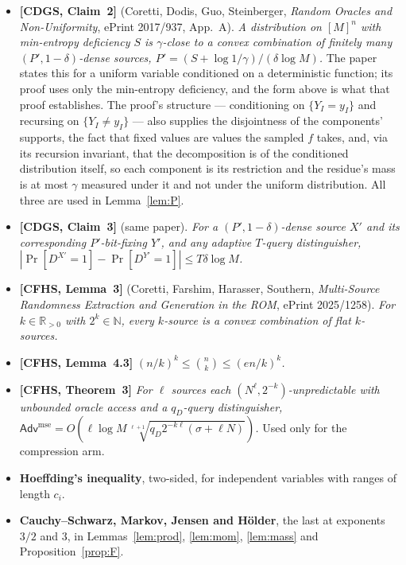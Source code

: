 \documentclass{aicr-solution}
\newcommand{\Adv}{\mathsf{Adv}}
\newcommand{\Prob}[1]{\Pr\!\left[#1\right]}
\begin{document}
\begin{itemize}
\item \textbf{[CDGS, Claim~2]} (Coretti, Dodis, Guo, Steinberger, \emph{Random
  Oracles and Non-Uniformity}, ePrint 2017/937, App.~A). \emph{A distribution on
  $[M]^{n}$ with min-entropy deficiency $S$ is $\gamma$-close to a convex
  combination of finitely many $(P',1-\delta)$-dense sources,
  $P'=(S+\log1/\gamma)/(\delta\log M)$.} The paper states this for a uniform
  variable conditioned on a deterministic function; its proof uses only the
  min-entropy deficiency, and the form above is what that proof establishes. The
  proof's structure --- conditioning on $\{Y_I=y_I\}$ and recursing on
  $\{Y_I\ne y_I\}$ --- also supplies the disjointness of the components'
  supports, the fact that fixed values are values the sampled $f$ takes, and,
  via its recursion invariant, that the decomposition is of the conditioned
  distribution itself, so each component is its restriction and the residue's
  mass is at most $\gamma$ measured under it and not under the uniform
  distribution. All three are used in Lemma~\ref{lem:P}.
\item \textbf{[CDGS, Claim~3]} (same paper). \emph{For a $(P',1-\delta)$-dense
  source $X'$ and its corresponding $P'$-bit-fixing $Y'$, and any adaptive
  $T$-query distinguisher, $|\Prob{D^{X'}=1}-\Prob{D^{Y'}=1}|\le T\delta\log M$.}
\item \textbf{[CFHS, Lemma~3]} (Coretti, Farshim, Harasser, Southern,
  \emph{Multi-Source Randomness Extraction and Generation in the ROM}, ePrint
  2025/1258). \emph{For $k\in\mathbb R_{>0}$ with $2^{k}\in\mathbb N$, every
  $k$-source is a convex combination of flat $k$-sources.}
\item \textbf{[CFHS, Lemma~4.3]} \emph{$(n/k)^{k}\le\binom nk\le(en/k)^{k}$.}
\item \textbf{[CFHS, Theorem~3]} \emph{For $\ell$ sources each
  $(N^{\ell},2^{-k})$-unpredictable with unbounded oracle access and a
  $q_D$-query distinguisher,
  $\Adv^{\mathrm{mse}}=O(\ell\log M\sqrt[\ell+1]{q_D2^{-k\ell}(\sigma+\ell N)})$.}
  Used only for the compression arm.
\item \textbf{Hoeffding's inequality}, two-sided, for independent variables with
  ranges of length $c_i$.
\item \textbf{Cauchy--Schwarz, Markov, Jensen and H\"older}, the last at exponents
  $3/2$ and $3$, in Lemmas~\ref{lem:prod}, \ref{lem:mom}, \ref{lem:mass} and
  Proposition~\ref{prop:F}.
\end{itemize}
\end{document}
